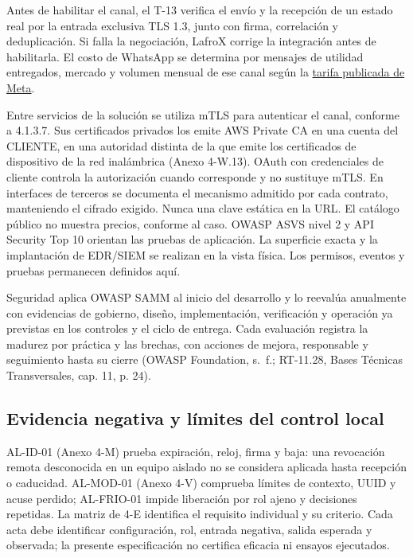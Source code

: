Antes de habilitar el canal, el T-13 verifica el envío y la recepción de un estado real por la entrada exclusiva TLS 1.3, junto con firma, correlación y deduplicación. Si falla la negociación, LafroX corrige la integración antes de habilitarla. El costo de WhatsApp se determina por mensajes de utilidad entregados, mercado y volumen mensual de ese canal según la \href{https://developers.facebook.com/documentation/business-messaging/whatsapp/pricing/}{tarifa publicada de Meta}.

Entre servicios de la solución se utiliza mTLS para autenticar el canal, conforme a 4.1.3.7. Sus certificados privados los emite AWS Private CA en una cuenta del CLIENTE, en una autoridad distinta de la que emite los certificados de dispositivo de la red inalámbrica (Anexo 4-W.13). OAuth con credenciales de cliente controla la autorización cuando corresponde y no sustituye mTLS. En interfaces de terceros se documenta el mecanismo admitido por cada contrato, manteniendo el cifrado exigido. Nunca una clave estática en la URL. El catálogo público no muestra precios, conforme al caso. OWASP ASVS nivel 2 y API Security Top 10 orientan las pruebas de aplicación. La superficie exacta y la implantación de EDR/SIEM se realizan en la vista física. Los permisos, eventos y pruebas permanecen definidos aquí.

Seguridad aplica OWASP SAMM al inicio del desarrollo y lo reevalúa anualmente con evidencias de gobierno, diseño, implementación, verificación y operación ya previstas en los controles y el ciclo de entrega. Cada evaluación registra la madurez por práctica y las brechas, con acciones de mejora, responsable y seguimiento hasta su cierre (OWASP Foundation, s.~f.; RT-11.28, Bases Técnicas Transversales, cap. 11, p. 24).

\subsection*{Evidencia negativa y límites del control local}
AL-ID-01 (Anexo 4-M) prueba expiración, reloj, firma y baja: una revocación remota desconocida en un equipo aislado no se considera aplicada hasta recepción o caducidad. AL-MOD-01 (Anexo 4-V) comprueba límites de contexto, UUID y acuse perdido; AL-FRIO-01 impide liberación por rol ajeno y decisiones repetidas. La matriz de 4-E identifica el requisito individual y su criterio. Cada acta debe identificar configuración, rol, entrada negativa, salida esperada y observada; la presente especificación no certifica eficacia ni ensayos ejecutados.

